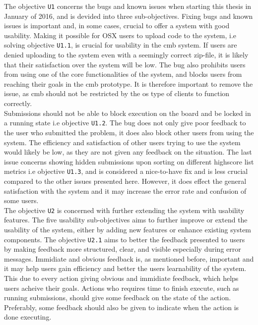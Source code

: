The objective \texttt{U1} concerns the bugs and known issues when starting this thesis in January of 2016, and is devided into three sub-objectives. Fixing bugs and known issues is important and, in some cases, crucial to offer a system with good usability. Making it possible for OSX users to upload code to the system, i.e solving objective \texttt{U1.1}, is crucial for usability in the \gls{cmb} system. If users are denied uploading to the system even with a seemingly correct zip-file, it is likely that their satisfaction over the system will be low. The bug also prohibits users from using one of the core functionalities of the system, and blocks users from reaching their goals in the \gls{cmb} prototype. It is therefore important to remove the issue, as \gls{cmb} should not be restricted by the \gls{os} type of clients to function correctly. \\

Submissions should not be able to block execution on the board and be locked in a running state i.e objective \texttt{U1.2}. The bug does not only give poor feedback to the user who submitted the problem, it does also block other users from using the system. The efficiency and satisfaction of other users trying to use the system would likely be low, as they are not given any feedback on the situation. The last issue concerns showing hidden submissions upon sorting on different highscore list metrics i.e objective \texttt{U1.3}, and is considered a nice-to-have fix and is less crucial compared to the other issues presented here. However, it does effect the general satisfaction with the system and it may increase the error rate and confusion of some users. \\

The objective \texttt{U2} is concerned with further extending the system with usability features. The five usability sub-objectives aims to further improve or extend the usability of the system, either by adding new features or enhance existing system components. The objective \texttt{U2.1} aims to better the feedback presented to users by making feedback more structured, clear, and visible especially during error messages. Immidiate and obvious feedback is, as mentioned before, important and it may help users gain efficiency and better the users learnability of the system. This due to every action giving obvious and immidiate feedback, which helps users acheive their goals. Actions who requires time to finish execute, such as running submissions, should give some feedback on the state of the action. Preferably, some feedback should also be given to indicate when the action is done executing. \\

